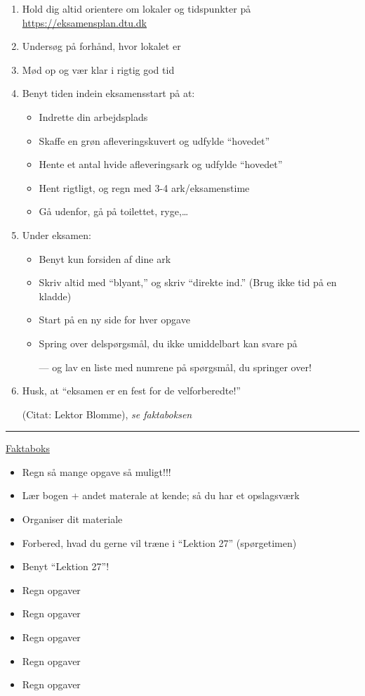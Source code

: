 \begin{enumerate}
    \item Hold dig altid orientere om lokaler og tidspunkter på \url{https://eksamensplan.dtu.dk}
    \item Undersøg på forhånd, hvor lokalet er
    \color{red} \item Mød op og vær klar i rigtig god tid \color{black}
    \item Benyt tiden indein eksamensstart på at:
	\begin{itemize}
	    \item Indrette din arbejdsplads
	    \item Skaffe en grøn afleveringskuvert og udfylde ``hovedet''
	    \item Hente et antal hvide afleveringsark og udfylde ``hovedet''
	    \item Hent rigtligt, og regn med 3-4 ark/eksamenstime
	    \item Gå udenfor, gå på toilettet, ryge,\ldots
	\end{itemize}
    \item Under eksamen:
	\begin{itemize}
	    \item Benyt kun forsiden af dine ark
	    \item Skriv altid med ``blyant,'' og skriv ``direkte ind.'' (Brug ikke tid på en kladde)
	    \item Start på en ny side for hver opgave
	    \item Spring over delspørgsmål, du ikke umiddelbart kan svare på

		--- og lav en liste med numrene på spørgsmål, du springer over!
	\end{itemize}
    \item Husk, at ``eksamen er en fest for de velforberedte!''

	(Citat: Lektor Blomme), \emph{se faktaboksen}
\end{enumerate}
\hrule
\vskip 10pt
\underline{Faktaboks}
\begin{itemize}
    \item Regn så mange opgave så muligt!!!
    \item Lær bogen + andet materale at kende; så du har et opslagsværk
    \item Organiser dit materiale
    \item Forbered, hvad du gerne vil træne i ``Lektion 27'' (spørgetimen)
    \item Benyt ``Lektion 27''!
    \item Regn opgaver
    \item Regn opgaver
    \item Regn opgaver
    \item Regn opgaver
    \item Regn opgaver
\end{itemize}
